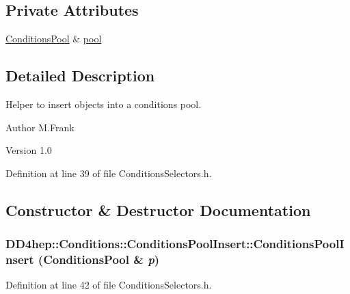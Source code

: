 \subsection*{Private Attributes}
\begin{DoxyCompactItemize}
\item 
\hyperlink{class_d_d4hep_1_1_conditions_1_1_conditions_pool}{ConditionsPool} \& \hyperlink{class_d_d4hep_1_1_conditions_1_1_conditions_pool_insert_a3b76b291e4a502751367ea7bd0b357b6}{pool}
\end{DoxyCompactItemize}


\subsection{Detailed Description}
Helper to insert objects into a conditions pool. \begin{DoxyAuthor}{Author}
M.Frank 
\end{DoxyAuthor}
\begin{DoxyVersion}{Version}
1.0 
\end{DoxyVersion}


Definition at line 39 of file ConditionsSelectors.h.

\subsection{Constructor \& Destructor Documentation}
\hypertarget{class_d_d4hep_1_1_conditions_1_1_conditions_pool_insert_aab6b0dc7865e247803d2ba6e37ef403d}{
\subsubsection[{ConditionsPoolInsert}]{\setlength{\rightskip}{0pt plus 5cm}DD4hep::Conditions::ConditionsPoolInsert::ConditionsPoolInsert ({\bf ConditionsPool} \& {\em p})}}
\label{class_d_d4hep_1_1_conditions_1_1_conditions_pool_insert_aab6b0dc7865e247803d2ba6e37ef403d}


Definition at line 42 of file ConditionsSelectors.h.

